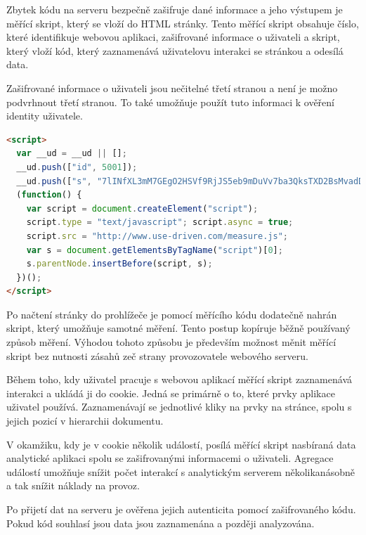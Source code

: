 \documentclass[bc,male,java,dept456]{diploma}						%
\begin{document}
Zbytek kódu na serveru bezpečně zašifruje dané informace a jeho výstupem je měřící skript, který se vloží do HTML stránky. Tento měřící skript obsahuje číslo, které identifikuje webovou aplikaci, zašifrované informace o uživateli a skript, který vloží kód, který zaznamenává uživatelovu interakci se stránkou a odesílá data.

Zašifrované informace o uživateli jsou nečitelné třetí stranou a není je možno podvrhnout třetí stranou. To také umožňuje použít tuto informaci k ověření identity uživatele.

\begin{lstlisting}[label=src:html,caption=Měřící skript,language=HTML]
<script> 
  var __ud = __ud || [];  
  __ud.push(["id", 5001]);
  __ud.push(["s", "7lINfXL3mM7GEgO2HSVf9RjJS5eb9mDuVv7ba3QksTXD2BsMvadDPeU-CoIzid5PDqJI6gCOi0EjmEGtI6XSDbu9at9vY8fw6rwssCDJVA2dfuZYF7kDwzpjzivNO OfAXQls78FzwcjDhc-gxwHohMAa0l9mb7MMlV5JcDDnx7A"]);
  (function() {
    var script = document.createElement("script");
    script.type = "text/javascript"; script.async = true;
    script.src = "http://www.use-driven.com/measure.js";
    var s = document.getElementsByTagName("script")[0]; 
    s.parentNode.insertBefore(script, s);
  })();
</script> 
\end{lstlisting}


Po načtení stránky do prohlížeče je pomocí měřícího kódu dodatečně nahrán skript, který umožňuje samotné měření. Tento postup kopíruje běžně používaný způsob měření. Výhodou tohoto způsobu je především možnost měnit měřící skript bez nutnosti zásahů zeč strany provozovatele webového serveru.

Během toho, kdy uživatel pracuje s webovou aplikací měřící skript zaznamenává interakci a ukládá ji do cookie. Jedná se primárně o to, které prvky aplikace uživatel používá. Zaznamenávají se jednotlivé kliky na prvky na stránce, spolu s jejich pozicí v hierarchii dokumentu.

V okamžiku, kdy je v cookie několik událostí, posílá měřící skript nasbíraná data analytické aplikaci spolu se zašifrovanými informacemi o uživateli. Agregace událostí umožňuje snížit počet interakcí s analytickým serverem několikanásobně a tak snížit náklady na provoz.

Po přijetí dat na serveru je ověřena jejich autenticita pomocí zašifrovaného kódu. Pokud kód souhlasí jsou data jsou zaznamenána a později analyzována.
\end{document}
